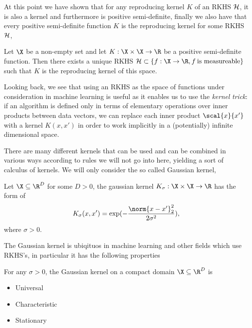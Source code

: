 At this point we have shown that for any reproducing kernel \(K\) of an RKHS
\(\mathcal{H}\), it is also a kernel and furthermore is positive semi-definite,
finally we also have that every positive semi-definite function \(K\) is the
reproducing kernel for some RKHS \(\mathcal{H}\),
\begin{theorem}
\label{thm:moore-aronszajn-pos-def-function-is-rep-kernel} Let \(\X\) be a
non-empty set and let \(K: \X \times \X \to \R\) be a positive semi-definite
function. Then there exists a unique RKHS \(\rkhs{H} \subset \{f : \X \to \R, f
\: \textrm{is measureable}\}\) such that \(K\) is the reproducing kernel of this
space.
\end{theorem}

Looking back, we see that using an RKHS as the space of functions under
consideration in machine learning is useful as it enables us to use the
\emph{kernel trick}: if an algorithm is defined only in terms of elementary
operations over inner products between data vectors, we can replace each inner
product \(\scal{x}{x'}\) with a kernel \(K(x, x')\) in order to work implicitly
in a (potentially) infinite dimensional space.

There are many different kernels that can be used and can be combined in various
ways according to rules we will not go into here, yielding a sort of calculus of
kernels. We will only consider the so called Gaussian kernel,
\begin{definition}
  \label{def:gaussian-kernel} Let \(\X \subseteq \R^D\) for some \(D > 0\), the
gaussian kernel \(K_{\sigma} : \X \times \X \to \R\) has the form of
  \begin{equation*}
    \label{eq:gaussian-kernel} K_{\sigma}(x, x') = \exp(-\frac{\norm{x -
x'}_2^2}{2\sigma^2}),
  \end{equation*} where \(\sigma > 0\).
\end{definition}

The Gaussian kernel is ubiqituos in machine learning and other fields which use
RKHS's, in particular it has the following properties
\begin{theorem}
  \label{th:gaussian-kernel-properties} For any \(\sigma > 0\), the Gaussian
  kernel on a compact domain \(\X \subseteq \R^D\) is
  \begin{itemize}
  \item Universal
  \item Characteristic
  \item Stationary
  \end{itemize}
\end{theorem}


